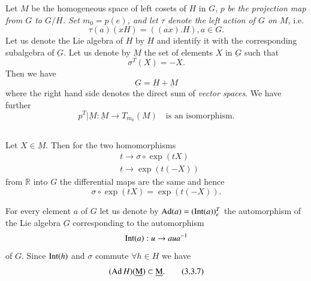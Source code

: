 Let $M$ be the homogeneous space of left cosets of $H$ in $G$, $p$
{\em be the projection map from $G$ to $G/H$. Set $m_{0}=p(e)$, and
  let $\tau$ denote the left action of $G$ on $M$}, i.e.
$$
\tau(a)(xH)=((ax).H), a\in G.
$$
Let us denote the Lie algebra of $H$ by $\underbar{H}$ and identify it
with the corresponding subalgebra of $\underbar{G}$. Let us denote by
$\underbar{M}$ the set of elements $X$ in $\underbar{G}$ such that
\begin{equation*}
\sigma^{T}(X)=-X.\tag{3.3.3}\label{chap3:3.3.3}
\end{equation*}\pageoriginale
Then we have
\begin{equation*}
\underbar{G}=\underbar{H}+\underbar{M}\tag{3.3.4}\label{chap3:3.3.4}
\end{equation*}
where the right hand side denotes the direct sum of {\em vector
  spaces}. We have further
\begin{equation*}
p^{T}|\underbar{M}:\underbar{M}\to T_{m_{0}}(M)\quad\text{is an
  isomorphism.}\tag{3.3.5}\label{chap3:3.3.5} 
\end{equation*}

\setcounter{subsection}{5}
\subsection{}\label{chap3:3.3.6}
Let $X\in\underbar{M}$. Then for the two homomorphisms
\begin{align*}
& t\to \sigma\circ \exp(tX)\\
& t\to \exp(t(-X))
\end{align*}
from $\mathbb{R}$ into $G$ the differential maps are the same and
hence
$$
\sigma\circ \exp(tX)=\exp(t(-X)).
$$

For every element $a$ of $G$ let us denote by
$\operatorname{Ad}(a)=(\operatorname{Int}(a))^{T}_{e}$ the automorphism of the Lie algebra
$\underbar{G}$ corresponding to the automorphism
$$
\operatorname{Int}(a):u\to aua^{-1}
$$
of $G$. Since $\operatorname{Int}(h)$ and $\sigma$ commute $\forall h\in H$ we have
\begin{equation*}
(\operatorname{Ad} H)(\underbar{M})\subset \underbar{M}.\tag{3.3.7}\label{chap3:3.3.7}
\end{equation*}

\setcounter{subsection}{7}

\subsection{}\label{chap3:3.3.8}

